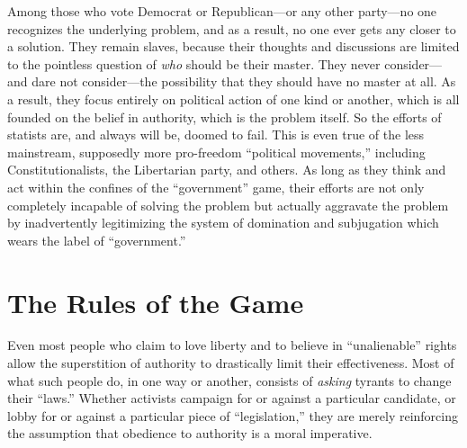 \documentclass{book}
\begin{document}
Among those who vote Democrat or Republican---or any other party---no one recognizes the underlying problem, and as a result, no one ever gets any closer to a solution. They remain slaves, because their thoughts and discussions are limited to the pointless question of \emph{who} should be their master. They never consider---and dare not consider---the possibility that they should have no master at all. As a result, they focus entirely on political action of one kind or another, which is all founded on the belief in authority, which is the problem itself. So the efforts of statists are, and always will be, doomed to fail. This is even true of the less mainstream, supposedly more pro-freedom \enquote{political movements,} including Constitutionalists, the Libertarian party, and others. As long as they think and act within the confines of the \enquote{government} game, their efforts are not only completely incapable of solving the problem but actually aggravate the problem by inadvertently legitimizing the system of domination and subjugation which wears the label of \enquote{government.}

\section{The Rules of the Game}

Even most people who claim to love liberty and to believe in \enquote{unalienable} rights allow the superstition of authority to drastically limit their effectiveness. Most of what such people do, in one way or another, consists of \emph{asking} tyrants to change their \enquote{laws.} Whether activists campaign for or against a particular candidate, or lobby for or against a particular piece of \enquote{legislation,} they are merely reinforcing the assumption that obedience to authority is a moral imperative.
\end{document}
